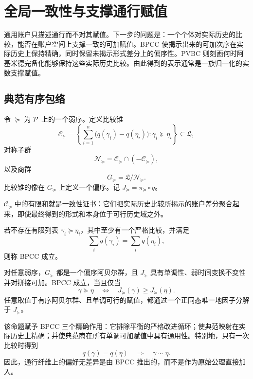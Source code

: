 \section{全局一致性与支撑通行赋值}\label{sec:ordinal}

通用账户只描述通行而不对其赋值。下一步的问题是：一个个体对实际历史的比较，能否在账户空间上支撑一致的可加赋值。BPCC 使揭示出来的可加次序在实际历史上保持精确，同时保留未揭示形式差分上的偏序性。PVBC 则刻画何时阿基米德完备化能够保持这些实际历史比较。由此得到的表示通常是一族归一化的实数支撑赋值。

\subsection{典范有序包络}

令 $\succeq$ 为 $\mathcal P$ 上的一个弱序。定义比较锥
\[
 \mathcal C_{\succeq}
 =\left\{
  \sum_{i=1}^n\bigl(q(\gamma_i)-q(\eta_i)\bigr):
  \gamma_i\succeq\eta_i
 \right\}\subseteq\mathfrak L,
\]
对称子群
\[
 \mathcal N_{\succeq}
 =\mathcal C_{\succeq}\cap(-\mathcal C_{\succeq}),
\]
以及商群
\[
 G_{\succeq}=\mathfrak L/\mathcal N_{\succeq}.
\]
比较锥的像在 $G_{\succeq}$ 上定义一个偏序。记 $J_{\succeq}=\pi_{\succeq}\circ q$。

$\mathcal C_{\succeq}$ 中的有限和就是一致性证书：它们把实际历史比较所揭示的账户差分聚合起来，即使最终得到的形式和本身位于可行历史域之外。

\begin{definition}
若不存在有限列表 $\gamma_i\succeq\eta_i$，其中至少有一个严格比较，并满足
\[
 \sum_i q(\gamma_i)=\sum_i q(\eta_i),
\]
则称 BPCC 成立。
\end{definition}

\begin{proposition}\label{prop:envelope}
对任意弱序，$G_{\succeq}$ 都是一个偏序阿贝尔群，且 $J_{\succeq}$ 具有单调性、弱时间变换不变性并对拼接可加。BPCC 成立，当且仅当
\[
 \gamma\succeq\eta
 \quad\Longleftrightarrow\quad
 J_{\succeq}(\gamma)\ge J_{\succeq}(\eta).
\]
任意取值于有序阿贝尔群、且单调可行的赋值，都通过一个正同态唯一地因子分解于 $J_{\succeq}$。
\end{proposition}

该命题赋予 BPCC 三个精确作用：它排除平衡的严格改进循环；使典范映射在实际历史上精确；并使典范商在所有单调可加赋值中具有通用性。特别地，只有一次比较时得到
\[
 q(\gamma)=q(\eta)
 \quad\Longrightarrow\quad
 \gamma\sim\eta.
\]
因此，通行纤维上的偏好无差异是由 BPCC 推出的，而不是作为原始公理直接加入。

